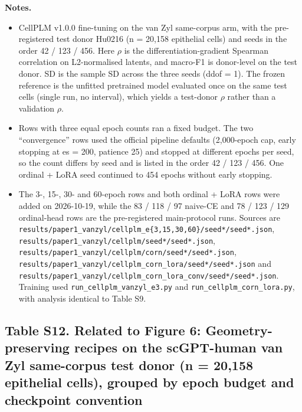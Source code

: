 \documentclass[12pt,a4paper]{article}
\begin{document}
\textbf{Notes.}
\begin{itemize}
  \item CellPLM v1.0.0 fine-tuning on the van Zyl same-corpus arm, with the pre-registered test donor Hu0216 (n = 20,158 epithelial cells) and seeds in the order 42 / 123 / 456. Here $\rho$ is the differentiation-gradient Spearman correlation on L2-normalised latents, and macro-F1 is donor-level on the test donor. SD is the sample SD across the three seeds (ddof = 1). The frozen reference is the unfitted pretrained model evaluated once on the same test cells (single run, no interval), which yields a test-donor $\rho$ rather than a validation $\rho$.
  \item Rows with three equal epoch counts ran a fixed budget. The two ``convergence'' rows used the official pipeline defaults (2,000-epoch cap, early stopping at es = 200, patience 25) and stopped at different epochs per seed, so the count differs by seed and is listed in the order 42 / 123 / 456. One ordinal + LoRA seed continued to 454 epochs without early stopping.
  \item The 3-, 15-, 30- and 60-epoch rows and both ordinal + LoRA rows were added on 2026-10-19, while the 83 / 118 / 97 naive-CE and 78 / 123 / 129 ordinal-head rows are the pre-registered main-protocol runs. Sources are \texttt{results/paper1\_vanzyl/cellplm\_e\{3,15,30,60\}/seed*/seed*.json}, \texttt{results/paper1\_vanzyl/cellplm/seed*/seed*.json}, \texttt{results/paper1\_vanzyl/cellplm/corn/seed*/seed*.json}, \texttt{results/paper1\_vanzyl/cellplm\_corn\_lora/seed*/seed*.json} and \texttt{results/paper1\_vanzyl/cellplm\_corn\_lora\_conv/seed*/seed*.json}. Training used \texttt{run\_cellplm\_vanzyl\_e3.py} and \texttt{run\_cellplm\_corn\_lora.py}, with analysis identical to Table S9.
\end{itemize}

\newpage

\needspace{45mm}
\subsection*{Table S12. Related to Figure 6: Geometry-preserving recipes on the scGPT-human van Zyl same-corpus test donor (n = 20{,}158 epithelial cells), grouped by epoch budget and checkpoint convention}
\label{tab:S12}
\end{document}
